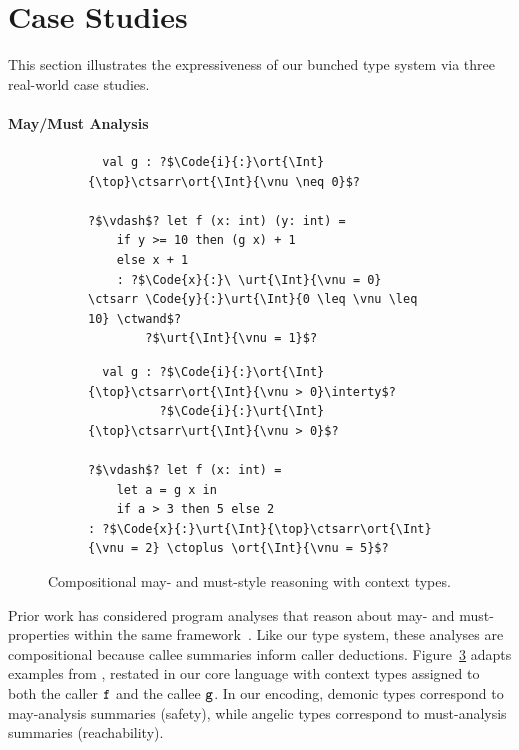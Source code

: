 \section{Case Studies} %
\label{sec:case}

This section illustrates the expressiveness of our bunched type system
via three real-world case studies.

\paragraph{May/Must Analysis} %
\label{subsec:may-must}
\begin{figure}
\begin{subfigure}[t]{0.48\linewidth}
    \centering
\begin{verbatim}
  val g : ?$\Code{i}{:}\ort{\Int}{\top}\ctsarr\ort{\Int}{\vnu \neq 0}$?

?$\vdash$? let f (x: int) (y: int) =
    if y >= 10 then (g x) + 1
    else x + 1
    : ?$\Code{x}{:}\ \urt{\Int}{\vnu = 0} \ctsarr \Code{y}{:}\urt{\Int}{0 \leq \vnu \leq 10} \ctwand$?
        ?$\urt{\Int}{\vnu = 1}$?
\end{verbatim}
    \label{fig:may-must-reach2}
\end{subfigure}
\hfill
\begin{subfigure}[t]{0.48\linewidth}
    \centering
\begin{verbatim}
  val g : ?$\Code{i}{:}\ort{\Int}{\top}\ctsarr\ort{\Int}{\vnu > 0}\interty$?
          ?$\Code{i}{:}\urt{\Int}{\top}\ctsarr\urt{\Int}{\vnu > 0}$?

?$\vdash$? let f (x: int) =
    let a = g x in
    if a > 3 then 5 else 2
: ?$\Code{x}{:}\urt{\Int}{\top}\ctsarr\ort{\Int}{\vnu = 2} \ctoplus \ort{\Int}{\vnu = 5}$?
\end{verbatim}
    \label{fig:may-must-inter}
\end{subfigure}
\vspace*{-.1in}
\caption{Compositional may- and must-style reasoning with context
  types.}
\label{fig:may-must-analysis}
\vspace*{-.1in}
\end{figure}
Prior work has considered program analyses that reason about may- and
must-properties within the same framework~\cite{BVR+08,GN+10}. Like
our type system, these analyses are compositional because callee
summaries inform caller deductions. Figure~\ref{fig:may-must-analysis}
adapts examples from \citet{GN+10}, restated in our
core language with context types assigned to both the caller
${\tt f}$ and the callee ${\tt g}$. In our encoding, demonic types
correspond to may-analysis summaries (safety), while angelic types
correspond to must-analysis summaries (reachability).

